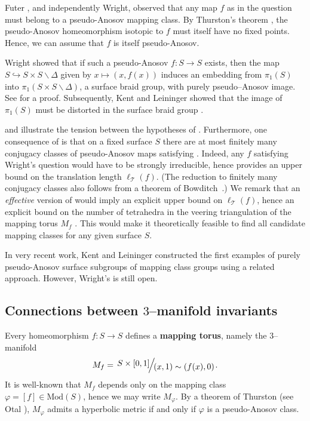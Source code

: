 \documentclass[11pt,letterpaper]{amsart}
\newcommand{\teich}{\mathcal T}
\newcommand{\quotient}[2]{{\raisebox{0.2em}{$#1$}
           \!\!\left/\raisebox{-0.2em}{\!$#2$}\right.}}
\numberwithin{equation}{section}
\theoremstyle{definition}
\newcommand{\Mod}{\mathrm{Mod}}
\newcommand{\define}[1]{\textbf{#1}}
\renewcommand{\setminus}{\smallsetminus}
\newcommand{\from}{\colon} %
\begin{document}
Futer \cite{Futer:Periodic}, and independently Wright, observed that any map $f$ as in the question must belong to a pseudo-Anosov mapping class. By Thurston's theorem \cite{BirmanKidwell}, the pseudo-Anosov homeomorphism isotopic to $f$ must itself have no fixed points.
Hence, we can assume that $f$ is itself pseudo-Anosov.

Wright showed that if such a pseudo-Anosov $f \colon S \to S$ exists, then the map $S \hookrightarrow S \times S \setminus \Delta$ given by $x \mapsto (x,f(x))$ induces an embedding from $\pi_1(S)$ into $\pi_1(S \times S \setminus \Delta)$, a surface braid group, with purely pseudo--Anosov image. 
See \cite[Lemma 9]{KentLeininger:AtoroidalBundles} for a proof. Subsequently, Kent and Leininger showed that the image of $\pi_1(S)$ must be distorted in the surface braid group \cite[Lemma 13]{KentLeininger:AtoroidalBundles}.

 and  illustrate the tension between the hypotheses of  .
Furthermore, one consequence of  is that on a fixed surface $S$ there are at most finitely many conjugacy classes of pseudo-Anosov maps satisfying . Indeed, any $f$ satisfying Wright's question would have to be strongly irreducible, hence  provides an upper bound on the translation length $\ell_\teich(f)$. (The reduction to finitely many conjugacy classes also follows from a theorem of Bowditch~\cite{Bowditch:AtoroidalBundles}.) We remark that an \emph{effective} version of 
 would imply an explicit upper bound on $\ell_\teich(f)$, 
hence an explicit bound on the number of tetrahedra in the veering triangulation of the mapping torus $M_f$ \cite[Theorem 4.1]{AgolTsang:Dynamics}.
This would make it 
theoretically feasible to find all candidate mapping classes for any given surface $S$.

In very recent work, Kent and Leininger constructed the first examples of purely pseudo-Anosov surface subgroups of mapping class groups  \cite{KentLeininger:AtoroidalBundles} using a related approach. However, Wright's  is still open. 

\subsection*{Connections between $3$--manifold invariants}

Every homeomorphism $f \from S \to S$ defines a \define{mapping torus}, namely the $3$--manifold
\[
M_f = \,\quotient{S \times [0,1]}{(x, 1) \sim (f(x), 0)}.
\]
It is well-known that $M_f$ depends only on the mapping class $\varphi = [f] \in \Mod(S)$, hence we may write $M_\varphi$. By a theorem of Thurston (see Otal \cite{Otal:Fibered}), $M_\varphi$ admits a hyperbolic metric if and only if $\varphi$ is a pseudo-Anosov class.
\end{document}
